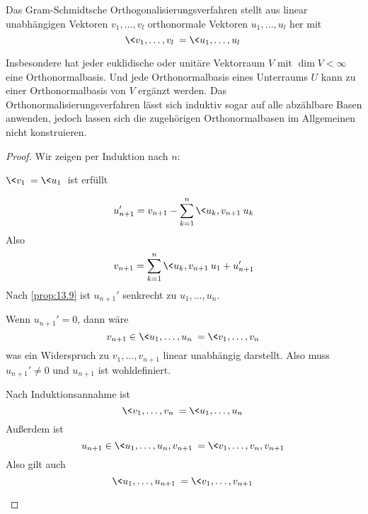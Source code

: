 \documentclass{mycourse}
\begin{document}
\begin{thm}
	\label{thm:13.11}
	Das Gram-Schmidtsche Orthogonalisierungsverfahren stellt aus linear unabhängigen Vektoren $v_1,\dotsc,v_l$ orthonormale Vektoren $u_1,\dotsc,u_l$ her mit
	\[
		\<v_1,\dotsc,v_l\> = \<u_1,\dotsc,u_l\>
	\]
	\begin{note}
		Insbesondere hat jeder euklidische oder unitäre Vektorraum $V$ mit $\dim V<\infty$ eine Orthonormalbasis.
		Und jede Orthonormalbasis eines Unterraums $U$ kann zu einer Orthonormalbasis von $V$ ergänzt werden. 
		Das Orthonormalisierungsverfahren lässt sich induktiv sogar auf alle abzählbare Basen anwenden, jedoch lassen
		sich die zugehörigen Orthonormalbasen im Allgemeinen nicht konstruieren.
	\end{note}
	\begin{proof}
		Wir zeigen per Induktion nach $n$:
		\begin{seg}[Induktionsanfang ($n=1$)]
			$\<v_1\> = \<u_1\>$ ist erfüllt
		\end{seg}
		\begin{seg}[Induktionsschritt]
			\[
				u_{n+1}' = v_{n+1}-\sum_{k=1}^n\<u_k,v_{n+1}\>u_k
			\]
			Also
			\[
				v_{n+1} = \sum_{k=1}^n \<u_k,v_{n+1}\>u_1 + u_{n+1}'
			\]
			Nach \ref{prop:13.9} ist $u_{n+1}'$ senkrecht zu $u_1,\dotsc,u_n$.

			Wenn $u_{n+1}' = 0$, dann wäre
			\[
				v_{n+1} \in \<u_1,\dotsc,u_n\> = \<v_1,\dotsc,v_n\>
			\]
			was ein Widerspruch zu $v_1,\dotsc,v_{n+1}$ linear unabhängig darstellt.
			Also muss $u_{n+1}' \neq 0$ und $u_{n+1}$ ist wohldefiniert.

			Nach Induktionsannahme ist
			\[
				\<v_1,\dotsc,v_n\> = \<u_1,\dotsc,u_n\>
			\]
			Außerdem ist
			\[
				u_{n+1}\in \<u_1,\dotsc,u_n,v_{n+1}\>  =\<v_1,\dotsc,v_n,v_{n+1}\>
			\]
			Also gilt auch
			\[
				\<u_1,\dotsc,u_{n+1}\> = \<v_1,\dotsc,v_{n+1}\>
			\]
		\end{seg}
	\end{proof}
\end{thm}
\end{document}
